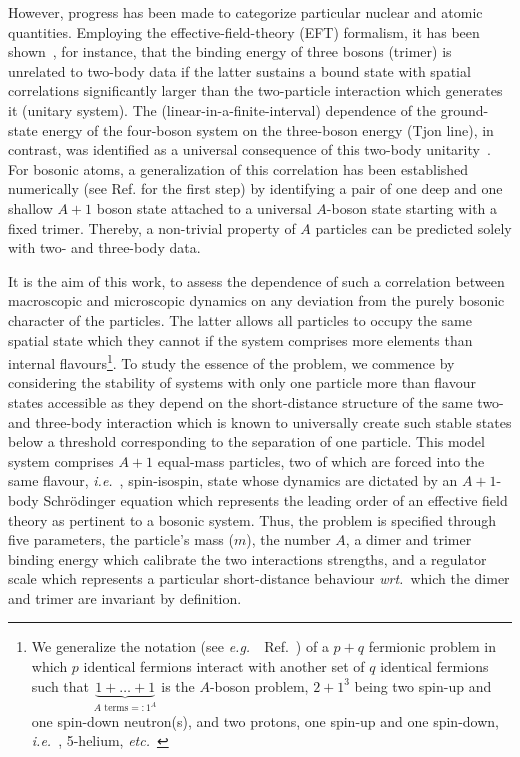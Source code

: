 \documentclass[preprint,12pt]{elsarticle}
\newcommand{\wrt}{\textit{wrt.}~}
\newcommand{\etc}{\textit{etc.}~}
\newcommand{\eg}{\textit{e.g.}~}
\newcommand{\ie}{\textit{i.e.}~}
\begin{document}
However, progress has been made to categorize particular nuclear and atomic quantities. Employing the
effective-field-theory (EFT) formalism, it has been shown~\cite{Bedaque:1998kg}, for instance, that the binding energy 
of three bosons (trimer)
is unrelated to two-body data if the latter sustains a bound state with spatial correlations significantly larger
than the two-particle interaction which generates it (unitary system). The (linear-in-a-finite-interval) dependence
of the ground-state
energy of the four-boson system on the three-boson energy (Tjon line), in contrast, was identified as a
universal consequence of this two-body unitarity~\cite{Platter:2004zs}.
For bosonic atoms, a generalization of this correlation has been
established numerically (see Ref.\cite{von_Stecher_2010} for the first step)
by identifying a pair of one deep and one shallow $A+1$ boson state attached to
a universal $A$-boson state starting with a fixed trimer.
Thereby, a non-trivial property of $A$ particles can
be predicted solely with two- and three-body data.

It is the aim of this work, to assess the dependence of such a correlation between macroscopic and microscopic
dynamics on any deviation from the purely bosonic character of the particles.
The latter allows all particles to occupy the same spatial state which they cannot if the system comprises
more elements than internal flavours\footnote{We generalize the notation (see \eg~Ref.~\cite{PhysRevA.92.053624})
of a $p+q$ fermionic 
problem in which $p$ identical fermions
interact with another set of $q$ identical fermions such that $\underbrace{1+\ldots+1}_{\text{$A$ terms}=:1^A}$ is 
the $A$-boson problem, $2+1^3$ being two spin-up and one spin-down neutron(s), and two protons, one spin-up and
one spin-down, \ie, 5-helium, \etc}.
To study the essence of the problem, we commence by considering the stability of systems with only one particle
more than flavour states accessible as they depend on the short-distance structure of the same two- and three-body
interaction which is known to universally create such stable states below a threshold corresponding to the separation
of one particle. This model system comprises $A+1$ equal-mass particles, two of which are forced into the same
flavour, \ie, spin-isospin, state whose dynamics are dictated by an $A+1$-body Schr\"odinger equation which
represents the leading order of an effective field theory as pertinent to a bosonic system.
Thus, the problem is specified through five parameters, the particle's mass ($m$), the number $A$, a dimer and trimer
binding energy which calibrate the two interactions strengths, and a regulator scale which represents a particular
short-distance behaviour \wrt which the dimer and trimer are invariant by definition.
\end{document}
